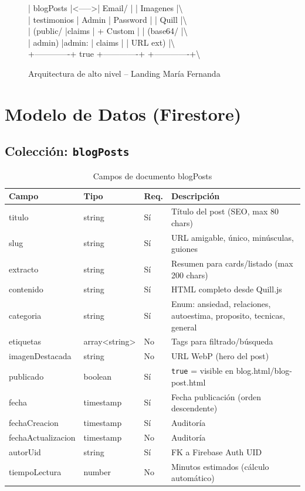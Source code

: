 \documentclass[12pt,a4paper,spanish]{report}
\begin{document}
\begin{figure}[H]
{\begin{minipage}{0.9\textwidth}
{    | blogPosts   |<----->| Email/      |       | Imagenes    |\textbackslash\\
    | testimonios | Admin | Password    |       | Quill       |\textbackslash\\
    | (public/    |claims | + Custom    |       | (base64/    |\textbackslash\\
    |  admin)     |admin: |  claims     |       |  URL ext)   |\textbackslash\\
    +-------------+ true  +-------------+       +-------------+\textbackslash\\
        }
    \end{minipage}}
    \caption{Arquitectura de alto nivel -- Landing María Fernanda}
    \label{fig:arquitectura}
\end{figure}

\section{Modelo de Datos (Firestore)}

\subsection{Colección: \texttt{blogPosts}}
\begin{table}[H]
    \centering
    \caption{Campos de documento blogPosts}
    \label{tab:blogposts}
    \begin{tabular}{lllp{5cm}}
        \toprule
        \textbf{Campo} & \textbf{Tipo} & \textbf{Req.} & \textbf{Descripción} \\
        \midrule
        titulo & string & Sí & Título del post (SEO, max 80 chars) \\
        slug & string & Sí & URL amigable, único, minúsculas, guiones \\
        extracto & string & Sí & Resumen para cards/listado (max 200 chars) \\
        contenido & string & Sí & HTML completo desde Quill.js \\
        categoria & string & Sí & Enum: ansiedad, relaciones, autoestima, proposito, tecnicas, general \\
        etiquetas & array<string> & No & Tags para filtrado/búsqueda \\
        imagenDestacada & string & No & URL WebP (hero del post) \\
        publicado & boolean & Sí & \texttt{true} = visible en blog.html/blog-post.html \\
        fecha & timestamp & Sí & Fecha publicación (orden descendente) \\
        fechaCreacion & timestamp & Sí & Auditoría \\
        fechaActualizacion & timestamp & No & Auditoría \\
        autorUid & string & Sí & FK a Firebase Auth UID \\
        tiempoLectura & number & No & Minutos estimados (cálculo automático) \\
        \bottomrule
    \end{tabular}
\end{table}
\end{document}
